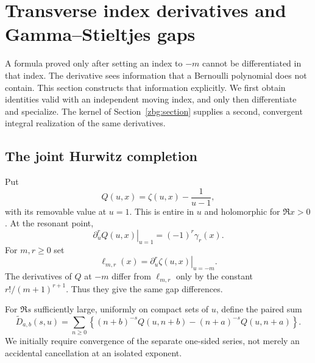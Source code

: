 \section{Transverse index derivatives and Gamma--Stieltjes gaps}
\label{tr:section}

A formula proved only after setting an index to $-m$ cannot be
differentiated in that index. The derivative sees information that a
Bernoulli polynomial does not contain. This section constructs that
information explicitly. We first obtain identities valid with an
independent moving index, and only then differentiate and specialize.
The kernel of Section~\ref{zbg:section} supplies a second, convergent
integral realization of the same derivatives.

\subsection{The joint Hurwitz completion}

Put
\begin{equation}\label{tr:Q}
 Q(u,x)=\zeta(u,x)-\frac1{u-1},
\end{equation}
with its removable value at $u=1$. This is entire in $u$ and holomorphic
for $\Re x>0$. At the resonant point,
\begin{equation}\label{tr:Qstieltjes}
 \left.\partial_u^rQ(u,x)\right|_{u=1}=(-1)^r\gamma_r(x).
\end{equation}
For $m,r\geq0$ set
\begin{equation}\label{tr:ell}
 \ell_{m,r}(x)=\left.\partial_u^r\zeta(u,x)\right|_{u=-m}.
\end{equation}
The derivatives of $Q$ at $-m$ differ from $\ell_{m,r}$ only by the
constant $r!/(m+1)^{r+1}$. Thus they give the same gap differences.

For $\Re s$ sufficiently large, uniformly on compact sets of $u$,
define the paired sum
\begin{equation}\label{tr:Dtilde}
 \widetilde D_{a,b}(s,u)=
 \sum_{n\geq0}\left\{
 (n+b)^{-s}Q(u,n+b)-(n+a)^{-s}Q(u,n+a)\right\}.
\end{equation}
We initially require convergence of the separate one-sided series,
not merely an accidental cancellation at an isolated exponent.

